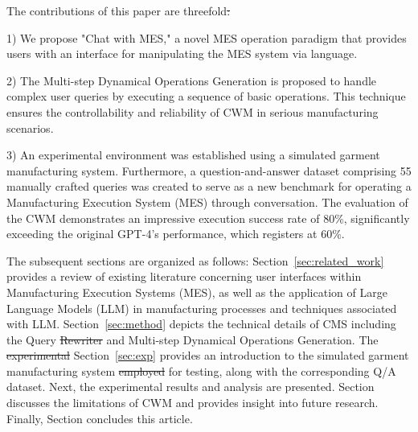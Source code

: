 \documentclass[preprint,12pt]{elsarticle}
\providecommand{\DIFaddtex}[1]{{\protect\color{blue}\uwave{#1}}} %
\providecommand{\DIFdeltex}[1]{{\protect\color{red}\sout{#1}}}                      %
\providecommand{\DIFaddbegin}{} %
\providecommand{\DIFaddend}{} %
\providecommand{\DIFdelbegin}{} %
\providecommand{\DIFdelend}{} %
\providecommand{\DIFadd}[1]{\texorpdfstring{\DIFaddtex{#1}}{#1}} %
\providecommand{\DIFdel}[1]{\texorpdfstring{\DIFdeltex{#1}}{}} %
\newcommand{\DIFscaledelfig}{0.5}
\newlength{\DIFdelgraphicswidth} %
\newlength{\DIFdelgraphicsheight} %
\newcommand{\DIFaddincludegraphics}[2][]{{\color{blue}\fbox{\DIFOincludegraphics[#1]{#2}}}} %
\newcommand{\DIFdelincludegraphics}[2][]{%
\sbox{\DIFdelgraphicsbox}{\DIFOincludegraphics[#1]{#2}}%
\settoboxwidth{\DIFdelgraphicswidth}{\DIFdelgraphicsbox} %
\settoboxtotalheight{\DIFdelgraphicsheight}{\DIFdelgraphicsbox} %
\scalebox{\DIFscaledelfig}{%
\parbox[b]{\DIFdelgraphicswidth}{\usebox{\DIFdelgraphicsbox}\\[-\baselineskip] \rule{\DIFdelgraphicswidth}{0em}}\llap{\resizebox{\DIFdelgraphicswidth}{\DIFdelgraphicsheight}{%
\setlength{\unitlength}{\DIFdelgraphicswidth}%
\begin{picture}(1,1)%
\thicklines\linethickness{2pt} %
{\color[rgb]{1,0,0}\put(0,0){\framebox(1,1){}}}%
{\color[rgb]{1,0,0}\put(0,0){\line( 1,1){1}}}%
{\color[rgb]{1,0,0}\put(0,1){\line(1,-1){1}}}%
\end{picture}%
}\hspace*{3pt}}} %
} %
\DeclareRobustCommand{\DIFaddbegin}{\DIFOaddbegin \let\includegraphics\DIFaddincludegraphics} %
\DeclareRobustCommand{\DIFaddend}{\DIFOaddend \let\includegraphics\DIFOincludegraphics} %
\DeclareRobustCommand{\DIFdelbegin}{\DIFOdelbegin \let\includegraphics\DIFdelincludegraphics} %
\DeclareRobustCommand{\DIFdelend}{\DIFOaddend \let\includegraphics\DIFOincludegraphics} %
\begin{document}

The contributions of this paper are threefold\DIFdelbegin \DIFdel{:
}\DIFdelend \DIFaddbegin \DIFadd{.
}\DIFaddend 

1) We propose "Chat with MES," a novel MES operation paradigm that provides users with an interface for manipulating the MES system via \DIFaddbegin \DIFadd{natural }\DIFaddend language.

2) The Multi-step Dynamical Operations Generation is proposed to handle complex user queries by executing a sequence of basic operations. This technique ensures the controllability and reliability of CWM in serious manufacturing scenarios.

3) An experimental environment was established using a simulated garment manufacturing system. Furthermore, a \DIFaddbegin \DIFadd{new }\DIFaddend question-and-answer dataset comprising 55 manually crafted queries was created to serve as a new benchmark for operating a Manufacturing Execution System (MES) through conversation.  
The evaluation of the CWM demonstrates an impressive execution success rate of 80\%, significantly exceeding the original GPT-4's performance, which registers at 60\%.

The subsequent sections are organized as follows:
Section~\ref{sec:related_work} provides a review of existing literature concerning user interfaces within Manufacturing Execution Systems (MES), as well as the application of Large Language Models (LLM) in manufacturing processes and techniques associated with LLM.
Section~\ref{sec:method} depicts the technical details of CMS including the Query \DIFdelbegin \DIFdel{Rewriter }\DIFdelend \DIFaddbegin \DIFadd{Rewriting }\DIFaddend and Multi-step Dynamical Operations Generation.
The \DIFdelbegin \DIFdel{experimental }\DIFdelend \DIFaddbegin \DIFadd{experiment }\DIFaddend Section~\ref{sec:exp} provides an introduction to the simulated garment manufacturing system \DIFdelbegin \DIFdel{employed }\DIFdelend \DIFaddbegin \DIFadd{used }\DIFaddend for testing, along with the corresponding Q/A dataset.
Next, the experimental results and analysis are presented.
Section \DIFdelbegin %
\DIFdelend \DIFaddbegin \DIFadd{\ref{sec:discussion} }\DIFaddend discusses the limitations of CWM and provides insight into future research. 
Finally, Section \DIFdelbegin %
\DIFdelend \DIFaddbegin \DIFadd{\ref{sec:conclusion} }\DIFaddend concludes this article.
\end{document}
